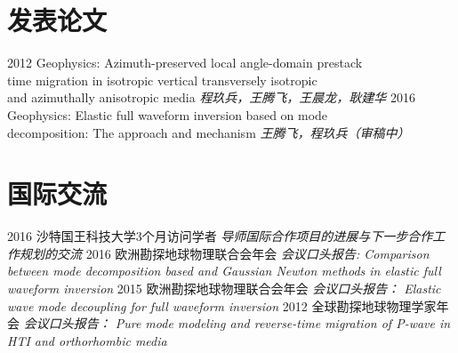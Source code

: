 \documentclass[]{friggeri-cvblackwhite}
\begin{document}
\section{发表论文}
\begin{entrylist}
  \entry
    {2012}
	{Geophysics: Azimuth-preserved local angle-domain prestack \\
	time migration in isotropic	vertical transversely isotropic\\
	and azimuthally anisotropic media}
	{\emph{程玖兵，王腾飞，王晨龙，耿建华}}
  \entry
    {2016}
	{Geophysics: Elastic full waveform inversion based on mode\\
		decomposition: The approach and	mechanism
	}
	{\emph{王腾飞，程玖兵（审稿中）}}
\end{entrylist}

\section{国际交流}
\begin{entrylist}
  \entry
    {2016}
    {沙特国王科技大学3个月访问学者}
	{\emph{
		导师国际合作项目的进展与下一步合作工作规划的交流
	}}
  \entry
    {2016}
    {欧洲勘探地球物理联合会年会}
	{\emph{会议口头报告: Comparison between mode decomposition based and Gaussian Newton methods in
		elastic full waveform inversion
	}}
  \entry
    {2015}
    {欧洲勘探地球物理联合会年会}
	{\emph{会议口头报告： 
		Elastic wave mode decoupling for full waveform inversion
	}}
  \entry
    {2012}
    {全球勘探地球物理学家年会}
	{\emph{会议口头报告： Pure mode modeling and reverse-time migration of P-wave in
		HTI and orthorhombic media
	}}
\end{entrylist}
\end{document}
